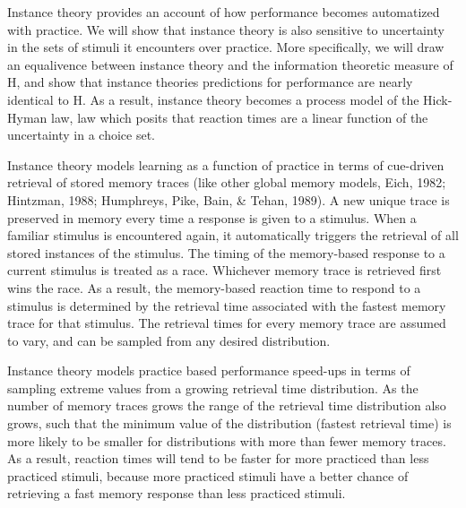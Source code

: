 \documentclass[,man,floatsintext]{apa6}
\begin{document}
Instance theory provides an account of how performance becomes automatized with practice. We will show that instance theory is also sensitive to uncertainty in the sets of stimuli it encounters over practice. More specifically, we will draw an equalivence between instance theory and the information theoretic measure of H, and show that instance theories predictions for performance are nearly identical to H. As a result, instance theory becomes a process model of the Hick-Hyman law, law which posits that reaction times are a linear function of the uncertainty in a choice set.

Instance theory models learning as a function of practice in terms of cue-driven retrieval of stored memory traces (like other global memory models, Eich, 1982; Hintzman, 1988; Humphreys, Pike, Bain, \& Tehan, 1989). A new unique trace is preserved in memory every time a response is given to a stimulus. When a familiar stimulus is encountered again, it automatically triggers the retrieval of all stored instances of the stimulus. The timing of the memory-based response to a current stimulus is treated as a race. Whichever memory trace is retrieved first wins the race. As a result, the memory-based reaction time to respond to a stimulus is determined by the retrieval time associated with the fastest memory trace for that stimulus. The retrieval times for every memory trace are assumed to vary, and can be sampled from any desired distribution.

Instance theory models practice based performance speed-ups in terms of sampling extreme values from a growing retrieval time distribution. As the number of memory traces grows the range of the retrieval time distribution also grows, such that the minimum value of the distribution (fastest retrieval time) is more likely to be smaller for distributions with more than fewer memory traces. As a result, reaction times will tend to be faster for more practiced than less practiced stimuli, because more practiced stimuli have a better chance of retrieving a fast memory response than less practiced stimuli.
\end{document}
